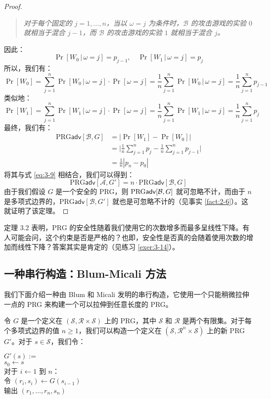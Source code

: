 \begin{proof}
\begin{quote}
\emph{对于每个固定的 $j=1,\dots,n$，当以 $\omega=j$ 为条件时，$\mathcal B$ 的攻击游戏的实验 $0$ 就相当于混合 $j-1$，而 $\mathcal B$ 的攻击游戏的实验 $1$ 就相当于混合 $j$。
}
\end{quote}
因此：
\[
\Pr[W_0\,|\,\omega=j]=p_{j-1},\quad
\Pr[W_1\,|\,\omega=j]=p_{j}
\]
所以，我们有：
\[
\Pr[W_0]
=\sum_{j=1}^n\Pr[W_0\,|\,\omega=j]\cdot\Pr[\omega=j]
=\frac{1}{n}\sum_{j=1}^n\Pr[W_0\,|\,\omega=j]
=\frac{1}{n}\sum_{j=1}^np_{j-1}
\]
类似地：
\[
\Pr[W_1]
=\sum_{j=1}^n\Pr[W_1\,|\,\omega=j]\cdot\Pr[\omega=j]
=\frac{1}{n}\sum_{j=1}^n\Pr[W_1\,|\,\omega=j]
=\frac{1}{n}\sum_{j=1}^np_{j}
\]
最终，我们有：
\[
\begin{aligned}
\mathrm{PRG}\mathsf{adv}[\mathcal{B},G]
&=|\Pr[W_1]-\Pr[W_0]|\\
&=\Bigg\lvert\frac{1}{n}\sum_{j=1}^np_j-\frac{1}{n}\sum_{j=1}^np_{j-1}\Bigg\rvert\\
&=\frac{1}{n}|p_n-p_0|
\end{aligned}
\]
将其与式 \ref{eq:3-9} 相结合，我们可以得到：
\[
\mathrm{PRG}\mathsf{adv}[\mathcal{A},G']
=n\cdot
\mathrm{PRG}\mathsf{adv}[\mathcal{B},G]
\]
由于我们假设 $G$ 是一个安全的 PRG，则 ${\rm PRG\mathsf{adv}}[\mathcal{B},G]$ 就可忽略不计，而由于 $n$ 是多项式边界的，$\mathrm{PRG}\mathsf{adv}[\mathcal{B},G']$ 就也是可忽略不计的（见事实 \ref{fact:2-6}）。这就证明了该定理。
\end{proof}

定理 3.2 表明，PRG 的安全性随着我们使用它的次数增多而最多呈线性下降。有人可能会问，这个约束是否是严格的？也即，安全性是否真的会随着使用次数的增加而线性下降？答案其实是肯定的（见练习 \ref{exer:3-14}）。

\subsection{一种串行构造：Blum-Micali 方法}\label{subsec:3-4-2}

我们下面介绍一种由 Blum 和 Micali 发明的串行构造，它使用一个只能稍微拉伸一点的 PRG 来构建一个可以拉伸到任意长度的 PRG。

令 $G$ 是一个定义在 $(\mathcal{S},\mathcal{R}\times\mathcal{S})$ 上的 PRG，其中 $\mathcal S$ 和 $\mathcal R$ 是两个有限集。对于每个多项式边界的值 $n\geq 1$，我们可以构造一个定义在 $(\mathcal{S},\mathcal{R}^n\times\mathcal{S})$ 上的新 PRG $G'$。对于 $s\in\mathcal{S}$，我们令：

\vspace*{10pt}

\hspace*{5pt} $G'(s):=$\\
\hspace*{50pt} $s_0\leftarrow s$\\
\hspace*{50pt} 对于 $i\leftarrow1$ 到 $n$：\\
\hspace*{75pt} 令 $(r_i,s_i)\leftarrow G(s_{i-1})$\\
\hspace*{50pt} 输出 $(r_1,\dots,r_n,s_n)$

